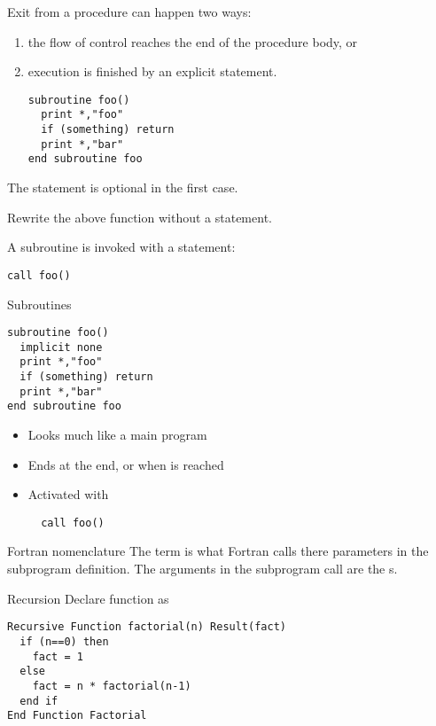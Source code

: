 Exit from a procedure can happen two ways:
\begin{enumerate}
\item the flow of control reaches the end of the procedure body, or
\item execution is finished by an explicit 
  statement.
\begin{verbatim}
subroutine foo()
  print *,"foo"
  if (something) return
  print *,"bar"
end subroutine foo
\end{verbatim}
\end{enumerate}
The  statement is optional in the first case.

\begin{exercise}
  Rewrite the above function  without a  statement.
\end{exercise}

A subroutine is invoked with a  statement:
\begin{verbatim}
call foo()
\end{verbatim}

\begin{slide}{Subroutines}
  \label{sl:subroutine}
\begin{verbatim}
subroutine foo()
  implicit none
  print *,"foo"
  if (something) return
  print *,"bar"
end subroutine foo
\end{verbatim}
\begin{itemize}
\item Looks much like a main program
\item Ends at the end, or when  is reached
\item Activated with 
\begin{verbatim}
  call foo()
\end{verbatim}
\end{itemize}
\end{slide}

\begin{block}{Fortran nomenclature}
  \label{sl:fortran-dummy}
  The term  is what Fortran calls there
  parameters in the subprogram definition. The arguments in the
  subprogram call are the s.
\end{block}

\begin{block}{Recursion}
  \label{sl:funcf:recursion}
  Declare function as ~
\begin{verbatim}
Recursive Function factorial(n) Result(fact)
  if (n==0) then
    fact = 1
  else
    fact = n * factorial(n-1)
  end if
End Function Factorial
\end{verbatim}
\end{block}

